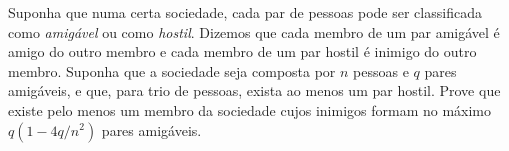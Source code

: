 Suponha que numa certa sociedade, cada par de pessoas pode ser classificada como \emph{amigável} ou como \emph{hostil}. Dizemos que cada membro de um par amigável é amigo do outro membro e cada membro de um par hostil é inimigo do outro membro. Suponha que a sociedade seja composta por $n$ pessoas e $q$ pares amigáveis, e que, para trio de pessoas, exista ao menos um par hostil. Prove que existe pelo menos um membro da sociedade cujos inimigos formam no máximo $q(1 - 4q/n^2)$ pares amigáveis.
